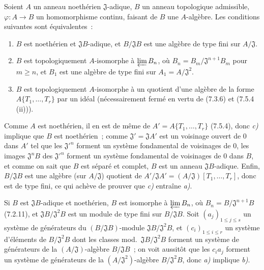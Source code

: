 \begin{proposition}[7.5.5]
\label{0.7.5.5-fr}
Soient $A$ un anneau noethérien $\mathfrak J$-adique, $B$ un anneau topologique
admissible, $\varphi:A\to B$ un homomorphisme continu, faisant de $B$ une
$A$-algèbre. Les conditions suivantes sont équivalentes~:
\begin{enumerate}
  \item[a)] $B$ est noethérien et $\mathfrak JB$-adique, et
  $B/\mathfrak JB$ est une algèbre de type fini sur $A/\mathfrak J$.

  \item[b)] $B$ est topologiquement $A$-isomorphe à $\varprojlim B_n$, où
  $B_n=B_m/\mathfrak J^{n+1}B_m$ pour $m\geq n$, et $B_1$ est une algèbre de
  type fini sur $A_1=A/\mathfrak J^2$.

  \item[c)] $B$ est topologiquement $A$-isomorphe à un quotient d'une algèbre
  de la forme\linebreak $A\{T_1,\ldots,T_r\}$ par un idéal (nécessairement fermé en vertu
  de \textup{(7.3.6)} et \textup{(7.5.4 (ii))}).
\end{enumerate}
\end{proposition}

Comme $A$ est noethérien, il en est de même de
$A'=A\{T_1,\ldots,T_r\}$ (7.5.4), donc \emph{c)} implique que $B$ est noethérien~;
comme $\mathfrak J'=\mathfrak JA'$ est un voisinage ouvert de 0 dans $A'$ tel
que les $\mathfrak J'^{n}$ forment un système fondamental de voisinages de 0,
les images $\mathfrak J^nB$ des $\mathfrak J'^{n}$ forment un système
fondamental de voisinages de 0 dans $B$, et comme on sait que $B$ est séparé et
complet, $B$ est un anneau $\mathfrak JB$-adique. Enfin, $B/\mathfrak JB$ est
une algèbre (sur $A/\mathfrak J$) quotient de
$A'/\mathfrak JA'=(A/\mathfrak J)[T_1,\ldots,T_r]$, donc est de type fini, ce
qui achève de prouver que \emph{c)} entraîne \emph{a)}.

Si $B$ est $\mathfrak JB$-adique et noethérien, $B$ est isomorphe à
$\varprojlim B_n$, où $B_n=B/\mathfrak J^{n+1}B$ (7.2.11), et
$\mathfrak JB/\mathfrak J^2B$ est un module de type fini sur
$B/\mathfrak JB$. Soit $(a_j)_{1\leq j\leq s}$ un système de générateurs du
$(B/\mathfrak JB)$-module $\mathfrak JB/\mathfrak J^2B$, et
$(c_i)_{1\leq i\leq r}$ un système d'éléments de $B/\mathfrak J^2B$ dont les
classes
mod.~$\mathfrak JB/\mathfrak J^2B$ forment un système de générateurs de la
$(A/\mathfrak J)$-algèbre $B/\mathfrak JB$~; on voit aussitôt que les $c_ia_j$
forment un système de générateurs de la $(A/\mathfrak J^2)$-algèbre
$B/\mathfrak J^2B$, donc \emph{a)} implique \emph{b)}.

